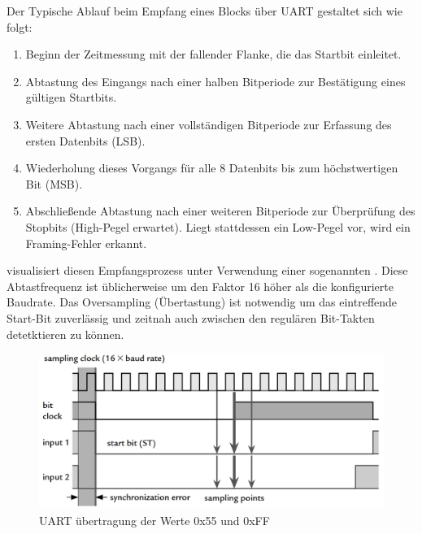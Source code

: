 Der Typische Ablauf beim Empfang eines Blocks \"uber UART gestaltet sich wie folgt:

\begin{enumerate}
	\item Beginn der Zeitmessung mit der fallender Flanke, die das Startbit einleitet.
	\item Abtastung des Eingangs nach einer halben Bitperiode zur Bestätigung eines gültigen Startbits.
	\item Weitere Abtastung nach einer vollständigen Bitperiode zur Erfassung des ersten Datenbits (LSB).
	\item Wiederholung dieses Vorgangs für alle 8 Datenbits bis zum h\"ochstwertigen Bit (MSB).
	\item Abschlie{\ss}ende Abtastung nach einer weiteren Bitperiode zur \"Uberpr\"ufung des Stopbits (High-Pegel erwartet). Liegt stattdessen ein Low-Pegel vor, wird ein Framing-Fehler erkannt.
\end{enumerate}

 visualisiert diesen Empfangsprozess unter Verwendung einer sogenannten . Diese Abtastfrequenz ist \"ublicherweise um den Faktor 16 h\"oher als die konfigurierte Baudrate. Das Oversampling (\"Ubertastung) ist notwendig um das eintreffende Start-Bit zuverl\"assig und zeitnah auch zwischen den regul\"aren Bit-Takten detetktieren zu k\"onnen.

\begin{figure}[h!]
	\centering
	\includegraphics[width=1.0\textwidth]{../Bilder/uart_protocoll.png}
	\caption{UART \"ubertragung der Werte 0x55 und 0xFF\\}
	\label{fig:uart_uebertragung}
\end{figure}

